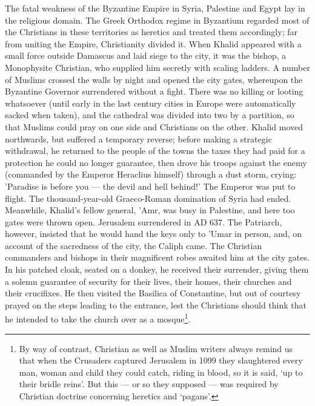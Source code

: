 \documentclass[10pt, twoside,openright]{book}
\begin{document}
The fatal weakness of the Byzantine Empire in Syria, Palestine and Egypt lay in the religious domain. The Greek Orthodox regime in Byzantium regarded most of the Christians in these territories as heretics and treated them accordingly; far from uniting the Empire, Christianity divided it. When Khalid appeared with a small force outside Damascus and laid siege to the city, it was the bishop, a Monophysite Christian, who supplied him secretly with scaling ladders. A number of Muslims crossed the walls by night and opened the city gates, whereupon the Byzantine Governor surrendered without a fight. There was no killing or looting whatsoever (until early in the last century cities in Europe were automatically sacked when taken), and the cathedral was divided into two by a partition, so that Muslims could pray on one side and Christians on the other. Khalid moved northwards, but suffered a temporary reverse; before making a strategic withdrawal, he returned to the people of the towns the taxes they had paid for a protection he could no longer guarantee, then drove his troops against the enemy (commanded by the Emperor Heraclius himself) through a dust storm, crying: 'Paradise is before you --- the devil and hell behind!' The Emperor was put to flight. The thousand\hyp{}year\hyp{}old Graeco\hyp{}Roman domination of Syria had ended. \\

Meanwhile, Khalid's fellow general, 'Amr, was busy in Palestine, and here too gates were thrown open. Jerusalem surrendered in AD 637. The Patriarch, however, insisted that he would hand the keys only to 'Umar in person, and, on account of the sacredness of the city, the Caliph came. The Christian commanders and bishops in their magnificent robes awaited him at the city gates. In his patched cloak, seated on a donkey, he received their surrender, giving them a solemn guarantee of security for their lives, their homes, their churches and their crucifixes. He then visited the Basilica of Constantine, but out of courtesy prayed on the steps leading to the entrance, lest the Christians should think that he intended to take the church over as a mosque\footnote{By way of contrast, Christian as well as Muslim writers always remind us that when the Crusaders captured Jerusalem in 1099 they slaughtered every man, woman and child they could catch, riding in blood, so it is said, `up to their bridle reins'. But this --- or so they supposed --- was required by Christian doctrine concerning heretics and `pagans'.}.\\
\end{document}
